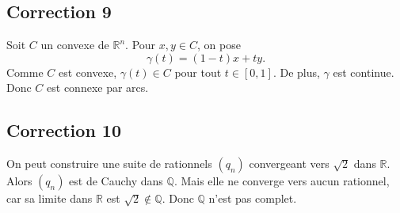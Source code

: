 \documentclass[11pt,a4paper]{article}
\theoremstyle{definition}
\theoremstyle{plain}
\newcommand{\R}{\mathbb{R}}
\newcommand{\Q}{\mathbb{Q}}
\begin{document}
\subsection*{Correction 9}
Soit $C$ un convexe de $\R^n$.
Pour $x,y\in C$, on pose
\[
\gamma(t)=(1-t)x+ty.
\]
Comme $C$ est convexe, $\gamma(t)\in C$ pour tout $t\in[0,1]$.
De plus, $\gamma$ est continue.
Donc $C$ est connexe par arcs.

\subsection*{Correction 10}
On peut construire une suite de rationnels $(q_n)$ convergeant vers $\sqrt2$ dans $\R$.
Alors $(q_n)$ est de Cauchy dans $\Q$.
Mais elle ne converge vers aucun rationnel, car sa limite dans $\R$ est $\sqrt2\notin\Q$.
Donc $\Q$ n'est pas complet.
\end{document}
